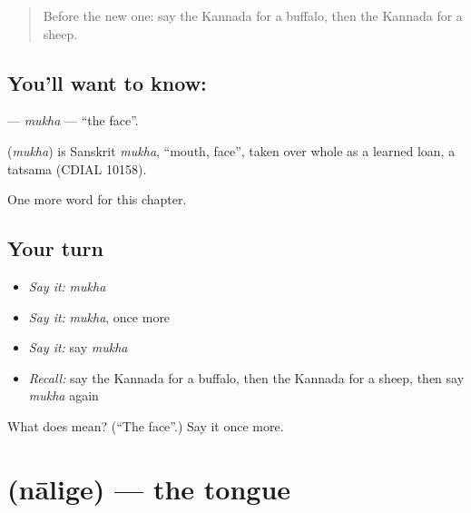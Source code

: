 \label{lesson:KA-C134-mukha}



\begin{quote}
Before the new one: say the Kannada for a buffalo, then the Kannada for a sheep.
\end{quote}

\subsection*{You'll want to know: }
\textbf{} — \emph{mukha} — \textquotedblleft{}the face\textquotedblright{}.

\begin{cousinweb}
\textbf{} (\emph{mukha}) is Sanskrit \emph{mukha}, \textquotedblleft{}mouth, face\textquotedblright{}, taken over whole as a learned loan, a tatsama (CDIAL 10158).
\end{cousinweb}

\begin{grammarlens}[title={What you've built}]
One more word for this chapter.
\end{grammarlens}

\subsection*{Your turn}
\begin{itemize}
\raggedright
  \item \emph{Say it:} \emph{mukha}
  \item \emph{Say it:} \emph{mukha}, once more
  \item \emph{Say it:} say \emph{mukha}
  \item \emph{Recall:} say the Kannada for a buffalo, then the Kannada for a sheep, then say \emph{mukha} again
\end{itemize}

\begin{tcolorbox}[breakable,colback=teal!4,colframe=teal!35!black,title={Before you move on}]
What does  mean? (\textquotedblleft{}The face\textquotedblright{}.) Say it once more.
\end{tcolorbox}
\section[\texorpdfstring{\kn{ನಾಲಿಗೆ} (nālige)}{ನಾಲಿಗೆ (nālige)}]{ (nālige) — the tongue}

\label{lesson:KA-C134-nalige}



